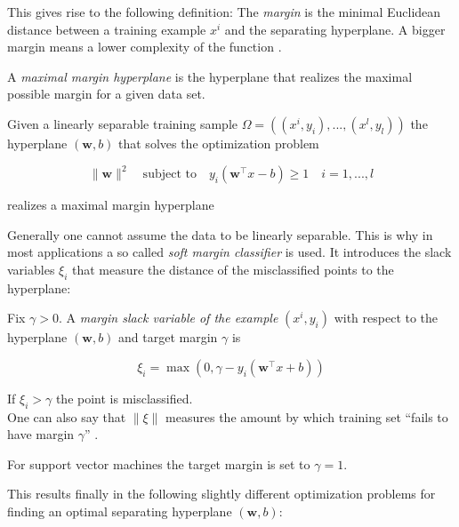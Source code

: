 This gives rise to the following definition:
The \emph{margin} is the minimal Euclidean distance between a training example \(x^i\) and the separating hyperplane.
A bigger margin means a lower complexity of the function \cite{Cristianini2000}. 

A \emph{maximal margin hyperplane} is the hyperplane that realizes the maximal possible margin for a given data set.

\begin{theorem} \cite{Cristianini2000}
Given a linearly separable training sample \(\Omega = ((x^i,y_i),...,(x^l,y_l))\) the hyperplane \((\bm{w},b)\) that solves the optimization problem

\[\|\bm{w}\|^2 \quad \text{subject to} \quad y_i(\bm{w}^{\top}x-b)\geq 1 \quad i = 1,...,l \]

realizes a maximal margin hyperplane  
\end{theorem}

Generally one cannot assume the data to be linearly separable. This is why in most applications a so called \emph{soft margin classifier} is used. It introduces the slack variables \(\xi_i\) that measure the distance of the misclassified points to the hyperplane:


Fix \(\gamma > 0\). A \emph{margin slack variable of the example} \((x^i,y_i)\) with respect to the hyperplane \((\bm{w},b)\) and target margin \(\gamma\) is 

\[\xi_i = \max(0, \gamma - y_i(\bm{w}^{\top}x+b))\] 

If \(\xi_i > \gamma\) the point is misclassified. \\
One can also say that \(\|\xi\|\) measures the amount by which training set ``fails to have margin \(\gamma\)'' \cite{Cristianini2000}.

For support vector machines the target margin is set to \(\gamma = 1\).

This results finally in the following slightly different optimization problems for finding an optimal separating hyperplane \((\bm{w},b)\): 

